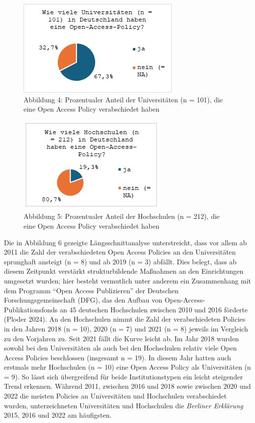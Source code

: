 \documentclass[a4paper,
fontsize=11pt,
oneside,
numbers=noperiodatend,
parskip=half-,
bibliography=totoc,
final
]{scrartcl}
\begin{document}
\begin{figure}[H]
\centering
\includegraphics[]{img/image005.png}
\caption{Abbildung 4: Prozentualer Anteil der Universitäten (n = 101), die eine Open Access Policy verabschiedet haben}
\end{figure}

\begin{figure}[H]
\centering
\includegraphics[]{img/image004.png}
\caption{Abbildung 5: Prozentualer Anteil der Hochschulen (n = 212), die eine Open Access Policy verabschiedet haben}
\end{figure}

Die in Abbildung 6 gezeigte Längsschnittanalyse unterstreicht, dass vor
allem ab 2011 die Zahl der verabschiedeten Open Access Policies an den
Universitäten sprunghaft ansteigt (n = 8) und ab 2019 (n = 3) abfällt. Dies
belegt, dass ab diesem Zeitpunkt verstärkt strukturbildende Maßnahmen an
den Einrichtungen umgesetzt wurden; hier besteht vermutlich unter
anderem ein Zusammenhang mit dem Programm \enquote{Open Access
Publizieren} der Deutschen Forschungsgemeinschaft (DFG), das den Aufbau
von Open-Access-Publikationsfonds an 45 deutschen Hochschulen zwischen
2010 und 2016 förderte (Ploder 2024). An den Hochschulen nimmt die Zahl
der verabschiedeten Policies in den Jahren 2018 (n = 10), 2020 (n = 7) und
2021 (n = 8) jeweils im Vergleich zu den Vorjahren zu. Seit 2021 fällt die
Kurve leicht ab. Im Jahr 2018 wurden sowohl bei den Universitäten als
auch bei den Hochschulen relativ viele Open Access Policies beschlossen
(insgesamt n = 19). In diesem Jahr hatten auch erstmals mehr Hochschulen
(n = 10) eine Open Access Policy als Universitäten (n = 9). So lässt sich
übergreifend für beide Institutionstypen ein leicht steigender Trend
erkennen. Während 2011, zwischen 2016 und 2018 sowie zwischen 2020 und
2022 die meisten Policies an Universitäten und Hochschulen verabschiedet
wurden, unterzeichneten Universitäten und Hochschulen die \emph{Berliner
Erklärung} 2015, 2016 und 2022 am häufigsten.
\end{document}
